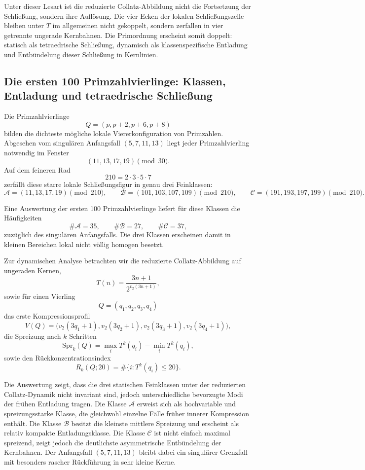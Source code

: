 \documentclass[11pt,a4paper]{article}
\theoremstyle{definition}
\begin{document}
Unter dieser Lesart ist die reduzierte Collatz-Abbildung nicht die
Fortsetzung der Schlie\ss ung, sondern ihre Aufl\"osung. Die vier Ecken
der lokalen Schlie\ss ungszelle bleiben unter $T$ im allgemeinen nicht
gekoppelt, sondern zerfallen in vier getrennte ungerade Kernbahnen.
Die Primordnung erscheint somit doppelt: statisch als tetraedrische
Schlie\ss ung, dynamisch als klassenspezifische Entladung und
Entb\"undelung dieser Schlie\ss ung in Kernlinien.

\subsection{Die ersten 100 Primzahlvierlinge: Klassen, Entladung und tetraedrische Schlie\ss ung}

Die Primzahlvierlinge
\[
Q=(p,p+2,p+6,p+8)
\]
bilden die dichteste m\"ogliche lokale Viererkonfiguration von Primzahlen.
Abgesehen vom singul\"aren Anfangsfall $(5,7,11,13)$ liegt jeder
Primzahlvierling notwendig im Fenster
\[
(11,13,17,19)\pmod{30}.
\]
Auf dem feineren Rad
\[
210=2\cdot 3\cdot 5\cdot 7
\]
zerf\"allt diese starre lokale Schlie\ss ungsfigur in genau drei Feinklassen:
\[
\mathcal A=(11,13,17,19)\pmod{210},\qquad
\mathcal B=(101,103,107,109)\pmod{210},\qquad
\mathcal C=(191,193,197,199)\pmod{210}.
\]

Eine Auswertung der ersten 100 Primzahlvierlinge liefert f\"ur diese
Klassen die H\"aufigkeiten
\[
\#\mathcal A=35,\qquad \#\mathcal B=27,\qquad \#\mathcal C=37,
\]
zuz\"uglich des singul\"aren Anfangsfalls. Die drei Klassen erscheinen
damit in kleinen Bereichen lokal nicht v\"ollig homogen besetzt.

Zur dynamischen Analyse betrachten wir die reduzierte Collatz-Abbildung
auf ungeraden Kernen,
\[
T(n)=\frac{3n+1}{2^{v_2(3n+1)}},
\]
sowie f\"ur einen Vierling
\[
Q=(q_1,q_2,q_3,q_4)
\]
das erste Kompressionsprofil
\[
V(Q)=\bigl(v_2(3q_1+1),v_2(3q_2+1),v_2(3q_3+1),v_2(3q_4+1)\bigr),
\]
die Spreizung nach $k$ Schritten
\[
\mathrm{Spr}_k(Q)=\max_i T^k(q_i)-\min_i T^k(q_i),
\]
sowie den R\"uckkonzentrationsindex
\[
R_k(Q;20)=\#\{i:T^k(q_i)\le 20\}.
\]

Die Auswertung zeigt, dass die drei statischen Feinklassen unter der
reduzierten Collatz-Dynamik nicht invariant sind, jedoch unterschiedliche
bevorzugte Modi der fr\"uhen Entladung tragen. Die Klasse $\mathcal A$
erweist sich als hochvariable und spreizungsstarke Klasse, die gleichwohl
einzelne F\"alle fr\"uher innerer Kompression enth\"alt. Die Klasse
$\mathcal B$ besitzt die kleinste mittlere Spreizung und erscheint als
relativ kompakte Entladungsklasse. Die Klasse $\mathcal C$ ist nicht
einfach maximal spreizend, zeigt jedoch die deutlichste asymmetrische
Entb\"undelung der Kernbahnen. Der Anfangsfall $(5,7,11,13)$ bleibt dabei
ein singul\"arer Grenzfall mit besonders rascher R\"uckf\"uhrung in sehr
kleine Kerne.
\end{document}
